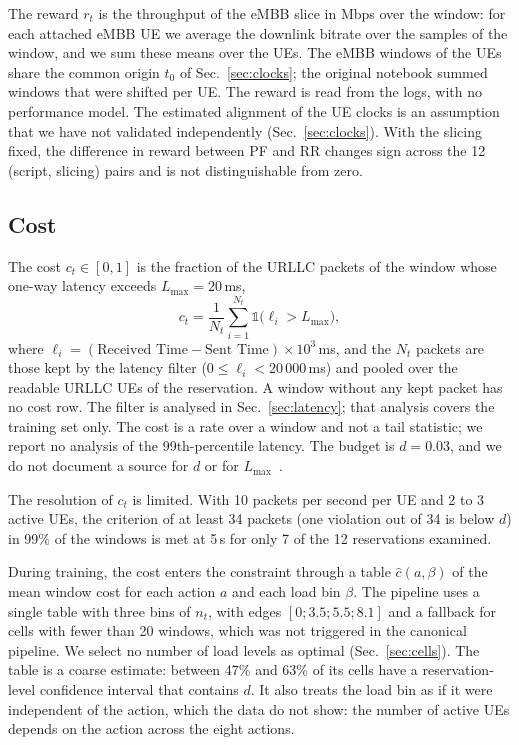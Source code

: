 The reward $r_t$ is the throughput of the eMBB slice in Mbps over the window: for each attached eMBB UE we average the downlink bitrate over the samples of the window, and we sum these means over the UEs.%
The eMBB windows of the UEs share the common origin $t_0$ of Sec.~\ref{sec:clocks}; the original notebook summed windows that were shifted per UE.%
The reward is read from the logs, with no performance model.%
The estimated alignment of the UE clocks is an assumption that we have not validated independently (Sec.~\ref{sec:clocks}).%
With the slicing fixed, the difference in reward between PF and RR changes sign across the 12 (script, slicing) pairs and is not distinguishable from zero.%

\subsection{Cost}
\label{sec:cost}

The cost $c_t\in[0,1]$ is the fraction of the URLLC packets of the window whose one-way latency exceeds $L_{\max}=20$\,ms,
\begin{equation}
  c_t=\frac{1}{N_t}\sum_{i=1}^{N_t}\mathbb{1}\bigl(\ell_i>L_{\max}\bigr),
  \label{eq:cost}
\end{equation}%
where $\ell_i=(\text{Received Time}-\text{Sent Time})\times 10^{3}$\,ms, and the $N_t$ packets are those kept by the latency filter ($0\le\ell_i<20\,000$\,ms) and pooled over the readable URLLC UEs of the reservation.%
A window without any kept packet has no cost row.%
The filter is analysed in Sec.~\ref{sec:latency}; that analysis covers the training set only.%
The cost is a rate over a window and not a tail statistic; we report no analysis of the 99th-percentile latency.%
The budget is $d=0.03$, and we do not document a source for $d$ or for $L_{\max}$~\cite{TODO-budget-latency-source}.%

The resolution of $c_t$ is limited.%
With 10 packets per second per UE and 2 to 3 active UEs, the criterion of at least 34 packets (one violation out of 34 is below $d$) in 99\% of the windows is met at 5\,s for only 7 of the 12 reservations examined.%

During training, the cost enters the constraint through a table $\hat c(a,\beta)$ of the mean window cost for each action $a$ and each load bin $\beta$.%
The pipeline uses a single table with three bins of $n_t$, with edges $[0;3.5;5.5;8.1]$ and a fallback for cells with fewer than 20 windows, which was not triggered in the canonical pipeline.%
We select no number of load levels as optimal (Sec.~\ref{sec:cells}).%
The table is a coarse estimate: between 47\% and 63\% of its cells have a reservation-level confidence interval that contains $d$.%
It also treats the load bin as if it were independent of the action, which the data do not show: the number of active UEs depends on the action across the eight actions.%

